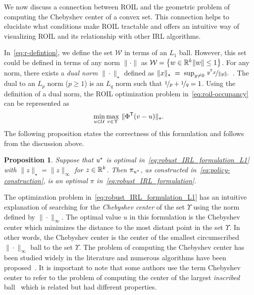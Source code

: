 \documentclass[10pt]{article}
\renewcommand{\cite}{\citep}
\theoremstyle{plain}
\newtheorem{proposition}{Proposition}
\theoremstyle{remark}
\begin{document}
We now discuss a connection between ROIL and the geometric problem of computing the Chebyshev center of a convex set. This connection helps to elucidate what conditions make ROIL tractable and offers an intuitive way of visualizing ROIL and its relationship with other IRL algorithms. 

In~\eqref{eq:r-defintion}, we define the set $\mathcal{W}$ in terms of an $L_1$ ball. However, this set could be defined in terms of any norm $\| \cdot \|$ as $\mathcal{W} = \left\{ w\in \mathbb{R}^k \| w \| \le 1 \right\}$.  For any norm, there exists a \emph{dual norm} $\| \cdot  \|_{\star}$ defined as \( \| x\|_{\star}\; =\;  \sup_{y \neq 0} \, \nicefrac{y ^{\mathsf{T}} x}{\|y\|} . \)~\cite{Horn2013}.
The dual to an $L_p$ norm ($p \ge 1$) is an $L_q$ norm such that $\nicefrac{1}{p} + \nicefrac{1}{q} = 1$. Using the definition of a dual norm, the ROIL optimization problem in~\eqref{eq:roil-occupancy} can be represented as
\begin{equation} \label{eq:robust_IRL_formulation_L1}
\min_{u \in \mathcal{U}} \max_{v \in \Upsilon} \, \|\Phi^{\mathsf{T}} (v - u)\|_{\star}.
\end{equation}
The following proposition states the correctness of this formulation and follows from the discussion above. 
\begin{proposition}
\label{thrm:chebeyshevRegret}
Suppose that $u^{\mathnormal{\star}}$ is optimal in~\eqref{eq:robust_IRL_formulation_L1} with $\| z  \|_{\star} = \| z \|_{\infty}$ for $z\in \mathbb{R}^k$. Then $\pi_{u^{\mathnormal{\star}}}$, as constructed in~\eqref{eq:policy-construction}, is an optimal $\pi$ in~\eqref{eq:robust_IRL_formulation}.
\end{proposition}

The optimization problem in~\eqref{eq:robust_IRL_formulation_L1} has an intuitive explanation of searching for the \emph{Chebyshev center} of the set $\Upsilon$ using the norm defined by $\| \cdot  \|_{\infty}$. The optimal value $u$ in this formulation is the Chebyshev center which minimizes the distance to the most distant point in the set $\Upsilon$. In other words, the Chebyshev center is the center of the smallest circumscribed $\| \cdot \|_{\infty}$ ball to the set $\Upsilon$. The problem of computing the Chebyshev center has been studied widely in the literature and numerous algorithms have been proposed~\cite{Wu2013, Eldar2008}. It is important to note that some authors use the term Chebyshev center to refer to the problem of computing the center of the largest \emph{inscribed} ball~\cite{Boyd_Convex_Optimization} which is related but had different properties.
\end{document}
